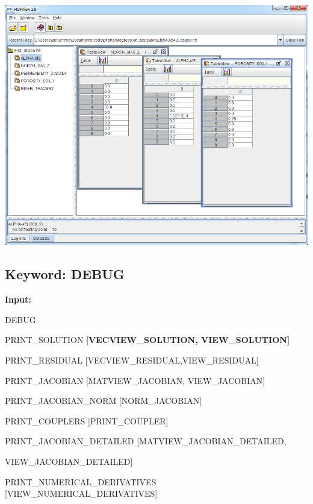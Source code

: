 \begin{center}
\includegraphics[scale=0.65]{./figs/h5_dbase.png}
\end{center}

\hyperlink{target_key}{\return}


\newpage
\protect\hypertarget{target_dbg}{}

\subsection{Keyword: DEBUG}

\hfill\hyperlink{target_key}{\return}

{\noindent\bf Input:}
\begin{deflist}{00}
\item[DEBUG]~
\begin{deflist}{00}
\item[PRINT\_SOLUTION] [\bf VECVIEW\_SOLUTION, VIEW\_SOLUTION]
\item[PRINT\_RESIDUAL] [VECVIEW\_RESIDUAL,VIEW\_RESIDUAL]
\item[PRINT\_JACOBIAN] [MATVIEW\_JACOBIAN, VIEW\_JACOBIAN]
\item[PRINT\_JACOBIAN\_NORM] [NORM\_JACOBIAN]
\item[PRINT\_COUPLERS] [PRINT\_COUPLER]
\item[PRINT\_JACOBIAN\_DETAILED] [MATVIEW\_JACOBIAN\_DETAILED, 

VIEW\_JACOBIAN\_DETAILED]

\item[PRINT\_NUMERICAL\_DERIVATIVES] [VIEW\_NUMERICAL\_DERIVATIVES]

\end{deflist}
\item[\keyend]
\end{deflist}

